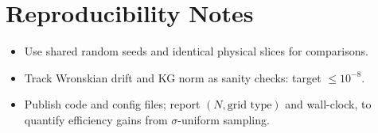 \documentclass[11pt]{article}
\begin{document}
\section{Reproducibility Notes}
\begin{itemize}
 \item Use shared random seeds and identical physical slices for comparisons.
 \item Track Wronskian drift and KG norm as sanity checks: target $\le 10^{-8}$.
 \item Publish code and config files; report $(N, \text{grid type})$ and wall-clock, to quantify efficiency gains from $\sigma$-uniform sampling.
\end{itemize}
\end{document}
